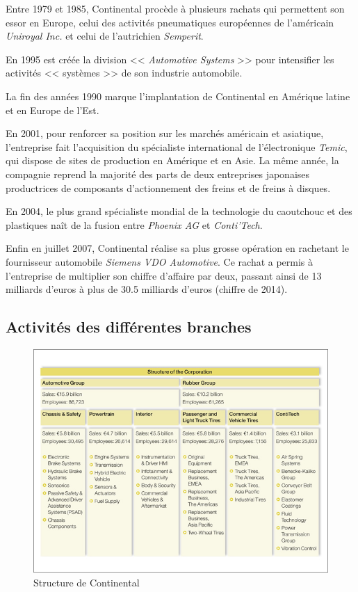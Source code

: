 Entre 1979 et 1985, Continental procède à plusieurs rachats qui permettent son essor en Europe, celui des activités pneumatiques européennes de l'américain \textit{Uniroyal Inc.} et celui de l'autrichien \textit{Semperit}.

En 1995 est créée la division << \textit{Automotive Systems} >> pour intensifier les activités << systèmes >> de son industrie automobile.

La fin des années 1990 marque l'implantation de Continental en Amérique latine et en Europe de l'Est.

En 2001, pour renforcer sa position sur les marchés américain et asiatique, l'entreprise fait l'acquisition du spécialiste international de l'électronique \textit{Temic}, qui dispose de sites de production en Amérique et en Asie. La même année, la compagnie reprend la majorité des parts de deux entreprises japonaises productrices de composants d'actionnement des freins et de freins à disques. 

En 2004, le plus grand spécialiste mondial de la technologie du caoutchouc et des plastiques naît de la fusion entre \textit{Phoenix AG} et \textit{Conti'Tech}.

Enfin en juillet 2007, Continental réalise sa plus grosse opération en rachetant le fournisseur automobile \textit{Siemens VDO Automotive}. Ce rachat a permis à l'entreprise de multiplier son chiffre d'affaire par deux, passant ainsi de 13 milliards d'euros à plus de 30.5 milliards d'euros (chiffre de 2014).
		
		\subsection{Activités des différentes branches}
		\begin{figure}[H]
			\centering
			\includegraphics[width=18cm]{contents/images/structureConti.jpg}
			\caption{Structure de Continental}
			\label{fig:structConti}
		\end{figure}

